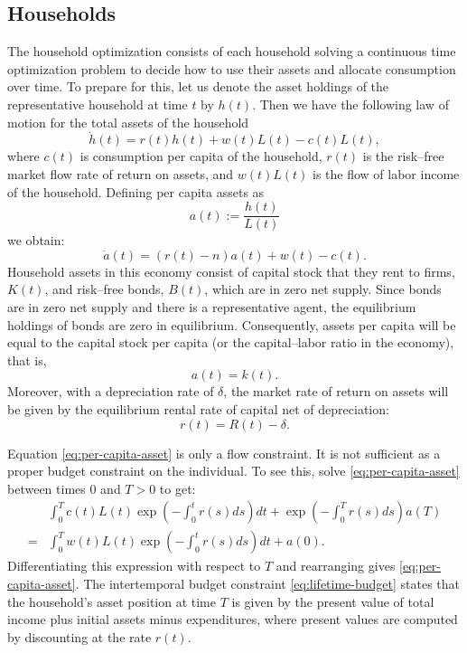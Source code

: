 \documentclass[\topdir/lecture\_notes.tex]{subfiles}
\begin{document}
\subsection{Households}
The household optimization consists of each household solving a continuous time optimization problem to decide how to use their assets and allocate consumption over time.
To prepare for this, let us denote the asset holdings of the representative household at time \(t\) by \(h(t)\).
Then we have the following law of motion for the total assets of the household
\begin{equation*}
  \dot{h}(t)=r(t) h(t)+w(t) L(t)-c(t) L(t),
\end{equation*}
where \(c(t)\) is consumption per capita of the household, \(r(t)\) is the risk--free market flow rate of return on assets, and \(w(t) L(t)\) is the flow of labor income of the household.
Defining per capita assets as
\[
  a(t) := \frac{h(t)}{L(t)}
\]
we obtain:
\begin{equation}
  \dot{a}(t)=(r(t)-n) a(t)+w(t)-c(t).
  \label{eq:per-capita-asset}
\end{equation}
Household assets in this economy consist of capital stock that they rent to firms, \(K(t)\), and risk--free bonds, \(B(t)\), which are in zero net supply.
Since bonds are in zero net supply and there is a representative agent, the equilibrium holdings of bonds are zero in equilibrium.
Consequently, assets per capita will be equal to the capital stock per capita (or the capital--labor ratio in the economy), that is,
\[
  a(t)=k(t).
\]
Moreover, with a depreciation rate of \(\delta\), the market rate of return on assets will be given by the equilibrium rental rate of capital net of depreciation:
\begin{equation}
  r(t)=R(t)-\delta.
  \label{eq:return-on-assets}
\end{equation}

Equation \eqref{eq:per-capita-asset} is only a flow constraint.
It is not sufficient as a proper budget constraint on the individual.
To see this, solve \eqref{eq:per-capita-asset} between times 0 and \(T>0\) to get:
\begin{equation}
  \begin{aligned}
      & \int_{0}^{T} c(t) L(t) \exp \left(-\int_{0}^{t} r(s) ds\right) dt+\exp \left(-\int_{0}^{T} r(s) ds\right) a(T) \\
    = & \int_{0}^{T} w(t) L(t) \exp \left(-\int_{0}^{t} r(s) ds\right) dt+a(0).
  \end{aligned}
  \label{eq:lifetime-budget}
\end{equation}
Differentiating this expression with respect to \(T\) and rearranging gives \eqref{eq:per-capita-asset}.
The intertemporal budget constraint \eqref{eq:lifetime-budget} states that the household's asset position at time \(T\) is given by the present value of total income plus initial assets minus expenditures, where present values are computed by discounting at the rate \(r(t)\).
\end{document}
